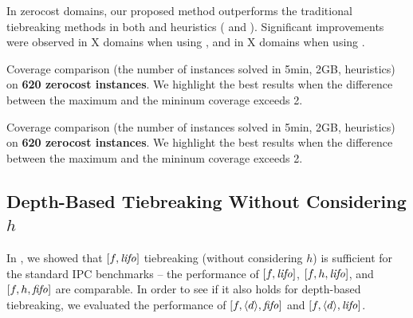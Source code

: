 

In zerocost domains, our proposed method outperforms the traditional
tiebreaking methods in both \lmcut and \mands heuristics
( and ).
Significant improvements were observed in X domains when using \lmcut,
and in X domains when using \mands.

\begin{table}[htbp]
 {
 \centering
 
 \caption{
 Coverage comparison (the number of instances solved in 5min, 2GB, \lmcut heuristics) 
 on \textbf{620 zerocost instances}. We highlight the
 best results when the difference between the maximum and the mininum coverage exceeds 2.
 }
 \label{tbl:lmcut-zerocost-full}
 }
\end{table}

\begin{table}[htbp]
 {
 \centering
 
 \caption{
 Coverage comparison (the number of instances solved in 5min, 2GB, \mands heuristics)
 on \textbf{620 zerocost instances}. We highlight the
 best results when the difference between the maximum and the mininum coverage exceeds 2.
 }
 \label{tbl:mands-zerocost-full}
 }
\end{table}



\subsection{Depth-Based Tiebreaking Without Considering $h$}

In , we showed that $[f,{\text{\textit{lifo}}}]$ tiebreaking
(without considering $h$) is sufficient for the standard IPC benchmarks
-- the performance of $[f,{\text{\textit{lifo}}}]$, $[f,h,{\text{\textit{lifo}}}]$, and $[f,h,{\text{\textit{fifo}}}]$ are
comparable.  In order to see if it also holds for depth-based
tiebreaking, we evaluated the performance of $[f,{\left<d\right>},{\text{\textit{fifo}}}]$
and $[f,{\left<d\right>},{\text{\textit{lifo}}}]$.

